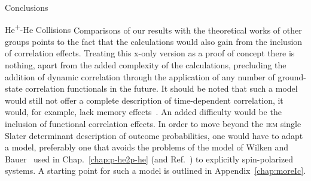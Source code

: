 \documentclass[letterpaper, 11 pt]{report}
\begin{document}
\begin{chapter}{Conclusions \label{chap:con}}
\begin{section}{\texorpdfstring{He\textsuperscript{+}}{He+}-He Collisions \label{sec:con-hephe}}
      Comparisons of our results with the theoretical works of other groups points to the fact that the
      calculations would also gain from the inclusion of correlation effects. Treating this x-only
      version as a proof of concept there is nothing, apart from the added complexity of the
      calculations, precluding the addition of dynamic correlation through the application of any number
      of ground-state correlation functionals in the future. It should be noted that such a model would
      still not offer a complete description of time-dependent correlation, it would, for example, lack
      memory effects~\cite{tddft}. An added difficulty would be the inclusion of functional correlation
      effects. In order to move beyond the \textsc{iem} single Slater determinant description of outcome
      probabilities, one would have to adapt a model, preferably one that avoids the problems of the
      model of Wilken and Bauer~\cite{wb} used in Chap.~\ref{chap:p-he2p-he} (and Ref.~\cite{p-he2p-he})
      to explicitly spin-polarized systems. A starting point for such a model is outlined in
      Appendix~\ref{chap:moreIc}.

   \end{section}

\end{chapter}
\end{document}

